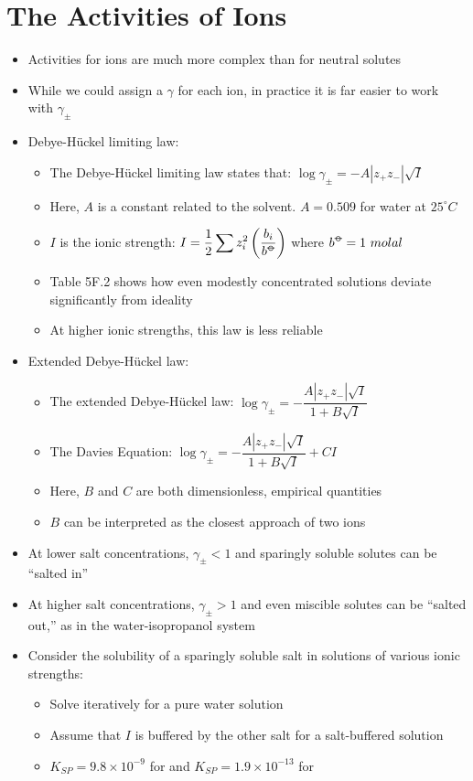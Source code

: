 \documentclass[12pt, openany, letterpaper]{memoir}
\begin{document}
\section{The Activities of Ions}
\begin{itemize}
	\item Activities for ions are much more complex than for neutral solutes
	\item While we could assign a $\gamma$ for each ion, in practice it is far easier to work with $\gamma_{\pm}$
	\item Debye-H\"uckel limiting law:
	\begin{itemize}
		\item The Debye-H\"uckel limiting law states that: $\log \gamma_\pm = -A\left|z_+z_-\right|\sqrt{I}$
		\item Here, $A$ is a constant related to the solvent. $A=0.509$ for water at $25^\circ C$
		\item $I$ is the ionic strength: $I = \dfrac{1}{2}\displaystyle\sum z_i^2\left(\dfrac{b_i}{b^{\std}}\right)$ where $b^{\std} = 1~molal$
		\item Table 5F.2 shows how even modestly concentrated solutions deviate significantly from ideality
		\item At higher ionic strengths, this law is less reliable 
	\end{itemize}
	\item Extended Debye-H\"uckel law:
	\begin{itemize}
		\item The extended Debye-H\"uckel law: $\log \gamma_\pm = -\dfrac{A\left|z_+z_-\right|\sqrt{I}}{1+B\sqrt{I}}$
		\item The Davies Equation: $\log \gamma_\pm = -\dfrac{A\left|z_+z_-\right|\sqrt{I}}{1+B\sqrt{I}} + CI$
		\item Here, $B$ and $C$ are both dimensionless, empirical quantities
		\item $B$ can be interpreted as the closest approach of two ions
	\end{itemize}
	\item At lower salt concentrations, $\gamma_\pm<1$ and sparingly soluble solutes can be ``salted in''
	\item At higher salt concentrations, $\gamma_\pm>1$ and even miscible solutes can be ``salted out,'' as in the water-isopropanol system
	\item Consider the solubility of a sparingly soluble salt in solutions of various ionic strengths:
	\begin{itemize}
		\item Solve iteratively for a pure water solution
		\item Assume that $I$ is buffered by the other salt for a salt-buffered solution
		\item $K_{SP} = 9.8\times10^{-9}$ for  and $K_{SP} = 1.9\times10^{-13}$ for 
	\end{itemize}
\end{itemize}
\end{document}
